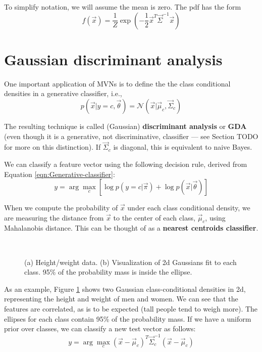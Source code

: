 To simplify notation, we will assume the mean is zero. The pdf has the form
\begin{equation}
f(\vec{x})=\dfrac{1}{Z}\exp\left(-\dfrac{1}{2}\vec{x}^T\vec{\Sigma}^{-1}\vec{x}\right)
\end{equation}


\section{Gaussian discriminant analysis}
One important application of MVNs is to define the the class conditional densities in a generative classifier, i.e.,
\begin{equation}
p(\vec{x}|y=c,\vec{\theta})=\mathcal{N}(\vec{x}|\vec{\mu}_c,\vec{\Sigma}_c)
\end{equation}

The resulting technique is called (Gaussian) \textbf{discriminant analysis} or \textbf{GDA} (even though it is a generative, not discriminative, classifier — see Section TODO for more on this distinction). If $\vec{\Sigma}_c$ is diagonal, this is equivalent to naive Bayes.

We can classify a feature vector using the following decision rule, derived from Equation \ref{eqn:Generative-classifier}:
\begin{equation}
y=\arg\max_{c} \left[\log p(y=c|\vec{\pi})+\log p(\vec{x}|\vec{\theta})\right]
\end{equation}

When we compute the probability of $\vec{x}$ under each class conditional density, we are measuring the distance from $\vec{x}$ to the center of each class, $\vec{\mu}_c$, using Mahalanobis distance. This can be thought of as a \textbf{nearest centroids classifier}.

\begin{figure}[hbtp]
\centering
{} \\
\caption{(a) Height/weight data. (b) Visualization of 2d Gaussians fit to each class. 95\% of the probability mass is inside the ellipse.}
\label{fig:2d-Gaussians-Visualization} 
\end{figure}

As an example, Figure \ref{fig:2d-Gaussians-Visualization} shows two Gaussian class-conditional densities in 2d, representing the height and weight of men and women. We can see that the features are correlated, as is to be expected (tall people tend to weigh more). The ellipses for each class contain 95\% of the probability mass. If we have a uniform prior over classes, we can classify a new test vector as follows:
\begin{equation}
y=\arg\max_{c} (\vec{x}-\vec{\mu}_c)^T\vec{\Sigma}_c^{-1}(\vec{x}-\vec{\mu}_c)
\end{equation}


